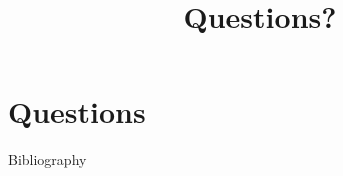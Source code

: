 \documentclass[11pt,t,usepdftitle=false,aspectratio=169]{beamer}
\begin{document}
\title{Questions?}
\subtitle{}
\section{Questions}


\appendix

\begin{frame}[allowframebreaks]{Bibliography}
	
	
\end{frame}
\end{document}
